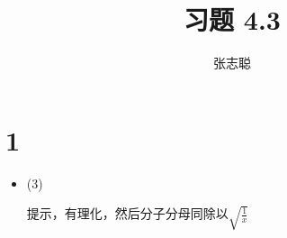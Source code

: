 \documentclass{article}
\begin{document}
\title{习题 4.3}
\author{张志聪}
\maketitle

\section*{1}

\begin{itemize}
  \item (3)

        提示，有理化，然后分子分母同除以$\sqrt{\frac{1}{x}}$


\end{itemize}
\end{document}
